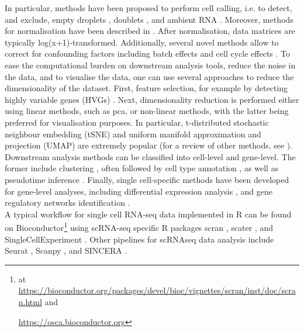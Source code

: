 In particular, methods have been proposed to perform  cell calling, i.e. to detect, and exclude, empty droplets \cite{lun2019emptydrops}, doublets \cite{wolock2019scrublet, mcginnis2019doubletfinder, depasquale2018doubletdecon}, and ambient RNA \cite{young2020soupx}.
Moreover, methods for normalisation have been described in \cite{lun2016pooling, vallejos2017normalizing, weinreb2018spring}.
After normalisation, data matrices are typically log(x+1)‐transformed. 
Additionally, several novel methods allow to correct for confounding factors including batch effects \cite{haghverdi2018batch, butler2018integrating, nowotschin2019emergent, stuart2019comprehensive, welch2019single, polanski2020bbknn} and cell cycle effects \cite{scialdone2015computational, mcdavid2016reply}.
To ease the computational burden on downstream analysis tools, reduce the noise in the data, and to visualise the data, one can use several approaches to reduce the dimensionality of the dataset.
First, feature selection, for example by detecting highly variable genes (HVGs) \cite{brennecke2013accounting, yip2019evaluation}.
Next, dimensionality reduction is performed either using linear methods, such as \gls{pca}, or non-linear methods, with the latter being preferred for visualisation purposes.
In particular, t-distributed stochastic neighbour embedding (tSNE)  \cite{maaten2008visualizing} and uniform manifold approximation and projection (UMAP) \cite{mcinnes2018umap} are extremely popular (for a review of other methods, see \cite{moon2018manifold}). 
Downstream analysis methods can be classified into cell-level and gene-level.
The former include clustering \cite{kiselev2017sc3, traag2019louvain}, often followed by cell type annotation \cite{kiselev2018scmap}, as well as pseudotime inference \cite{haghverdi2016diffusion, trapnell2014dynamics, bendall2014single, wolf2019paga}.
Finally, single cell-specific methods have been developed for gene-level analyses, including differential expression analysis \cite{finak16others}, and gene regulatory networks identification \cite{matsumoto2017scode, chan2017gene, aibar2017scenic}.\\

A typical workflow for single cell RNA-seq data implemented in R can be found on Bioconductor\footnote{at \url{https://bioconductor.org/packages/devel/bioc/vignettes/scran/inst/doc/scran.html} and

\url{https://osca.bioconductor.org}} using scRNA-seq specific R packages scran \cite{lun2016step, risso2016scrnaseq}, scater \cite{mccarthy2017scater}, and SingleCellExperiment 
\cite{lun2019singlecellexperiment}.
Other pipelines for scRNAseq data analysis include 
Seurat \cite{butler2018integrating},
Scanpy \cite{wolf2018scanpy}, 
and SINCERA \cite{guo2015sincera}. 


